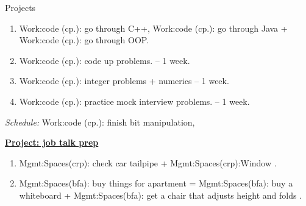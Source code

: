 \begin{block}{Projects}
\begin{enumerate}
\tiny \item \tiny Work:code (cp.): go through C++, Work:code (cp.): go through Java + Work:code (cp.): go through OOP. 
\item \tiny Work:code (cp.): code up problems.  – 1 week.
\item \tiny Work:code (cp.): integer problems + numerics   -- 1 week. 
\item \tiny Work:code (cp.): practice mock interview problems. – 1 week. 
\end{enumerate}
{\it Schedule:} Work:code (cp.): finish bit manipulation,

{\underline{\bf Project: job talk prep}}
\begin{enumerate} 
\item \tiny Mgmt:Spaces(crp): check car tailpipe +
  Mgmt:Spaces(crp):Window .
\item \tiny Mgmt:Spaces(bfa): buy things for apartment =
  Mgmt:Spaces(bfa): buy a whiteboard + Mgmt:Spaces(bfa): get a chair
  that adjusts height and folds \te{} \dl{} \pr{}. 
\end{enumerate}


\end{block}

